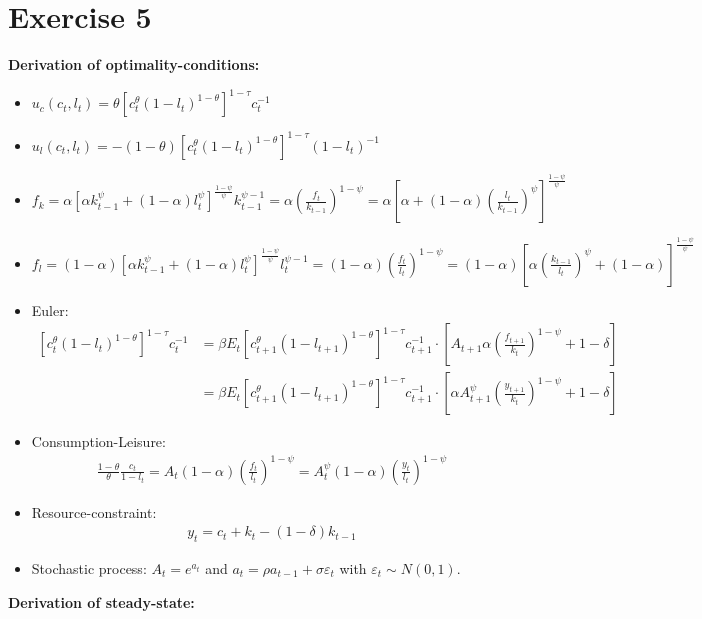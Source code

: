 \documentclass{article}
\begin{document}
\section*{Exercise 5}
\textbf{Derivation of optimality-conditions:}
\begin{itemize}
  \item $u_c(c_t,l_t)=\theta \left[c_t^\theta (1-l_t)^{1-\theta}\right]^{1-\tau}c_t^{-1}$
  \item $u_l(c_t,l_t)=-(1-\theta) \left[c_t^\theta (1-l_t)^{1-\theta}\right]^{1-\tau}(1-l_t)^{-1}$
  \item $f_k = \alpha \left[\alpha k_{t-1}^\psi + (1-\alpha)l_t^\psi\right]^\frac{1-\psi}{\psi} k_{t-1}^{\psi-1}=\alpha \left(\frac{f_t}{k_{t-1}}\right)^{1-\psi}=\alpha \left[\alpha + (1-\alpha)\left(\frac{l_t}{k_{t-1}}\right)^\psi\right]^\frac{1-\psi}{\psi}$
  \item $f_l = (1-\alpha) \left[\alpha k_{t-1}^\psi + (1-\alpha)l_t^\psi\right]^\frac{1-\psi}{\psi} l_{t}^{\psi-1}=(1-\alpha) \left(\frac{f_t}{l_{t}}\right)^{1-\psi}=(1-\alpha) \left[\alpha\left(\frac{k_{t-1}}{l_t}\right)^\psi + (1-\alpha)\right]^\frac{1-\psi}{\psi}$
  \item Euler:
  \begin{align*}
  \left[c_t^\theta (1-l_t)^{1-\theta}\right]^{1-\tau}c_t^{-1} &= \beta E_t \left[c_{t+1}^\theta (1-l_{t+1})^{1-\theta}\right]^{1-\tau}c_{t+1}^{-1}\cdot\left[A_{t+1} \alpha \left(\frac{f_{t+1}}{k_t}\right)^{1-\psi}+1-\delta\right]\\
      &=\beta E_t \left[c_{t+1}^\theta (1-l_{t+1})^{1-\theta}\right]^{1-\tau}c_{t+1}^{-1}\cdot\left[\alpha A_{t+1}^\psi  \left(\frac{y_{t+1}}{k_t}\right)^{1-\psi}+1-\delta\right]
  \end{align*}
  \item Consumption-Leisure:
  \begin{align*}
    \frac{1-\theta}{\theta}\frac{c_t}{1-l_t}=A_t (1-\alpha)\left(\frac{f_t}{l_t}\right)^{1-\psi}=A_t^\psi(1-\alpha)\left(\frac{y_t}{l_t}\right)^{1-\psi}
  \end{align*}
  \item Resource-constraint:
  \begin{align*}
    y_t = c_t + k_t -(1-\delta)k_{t-1}
  \end{align*}
  \item Stochastic process: $A_t = e^{a_t}$ and $a_t = \rho a_{t-1}+\sigma \varepsilon_t$ with $\varepsilon_t \sim N(0,1)$.
 \end{itemize}
\textbf{Derivation of steady-state:}
\end{document}
